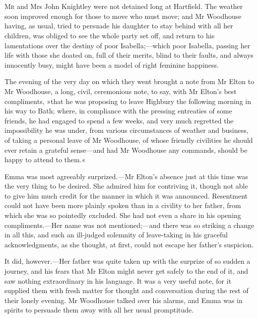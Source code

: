\chapter[Chapter \thechapter]{}
\lettrine[lines=4,lraise=0.3]{M}{r} and Mrs John Knightley were not detained long at Hartfield. The weather soon improved enough for those to move who must move; and Mr Woodhouse having, as usual, tried to persuade his daughter to stay behind with all her children, was obliged to see the whole party set off, and return to his lamentations over the destiny of poor Isabella;—which poor Isabella, passing her life with those she doated on, full of their merits, blind to their faults, and always innocently busy, might have been a model of right feminine happiness.

The evening of the very day on which they went brought a note from Mr Elton to Mr Woodhouse, a long, civil, ceremonious note, to say, with Mr Elton's best compliments, »that he was proposing to leave Highbury the following morning in his way to Bath; where, in compliance with the pressing entreaties of some friends, he had engaged to spend a few weeks, and very much regretted the impossibility he was under, from various circumstances of weather and business, of taking a personal leave of Mr Woodhouse, of whose friendly civilities he should ever retain a grateful sense—and had Mr Woodhouse any commands, should be happy to attend to them.«

Emma was most agreeably surprized.—Mr Elton's absence just at this time was the very thing to be desired. She admired him for contriving it, though not able to give him much credit for the manner in which it was announced. Resentment could not have been more plainly spoken than in a civility to her father, from which she was so pointedly excluded. She had not even a share in his opening compliments.—Her name was not mentioned;—and there was so striking a change in all this, and such an ill-judged solemnity of leave-taking in his graceful acknowledgments, as she thought, at first, could not escape her father's suspicion.

It did, however.—Her father was quite taken up with the surprize of so sudden a journey, and his fears that Mr Elton might never get safely to the end of it, and saw nothing extraordinary in his language. It was a very useful note, for it supplied them with fresh matter for thought and conversation during the rest of their lonely evening. Mr Woodhouse talked over his alarms, and Emma was in spirits to persuade them away with all her usual promptitude.

